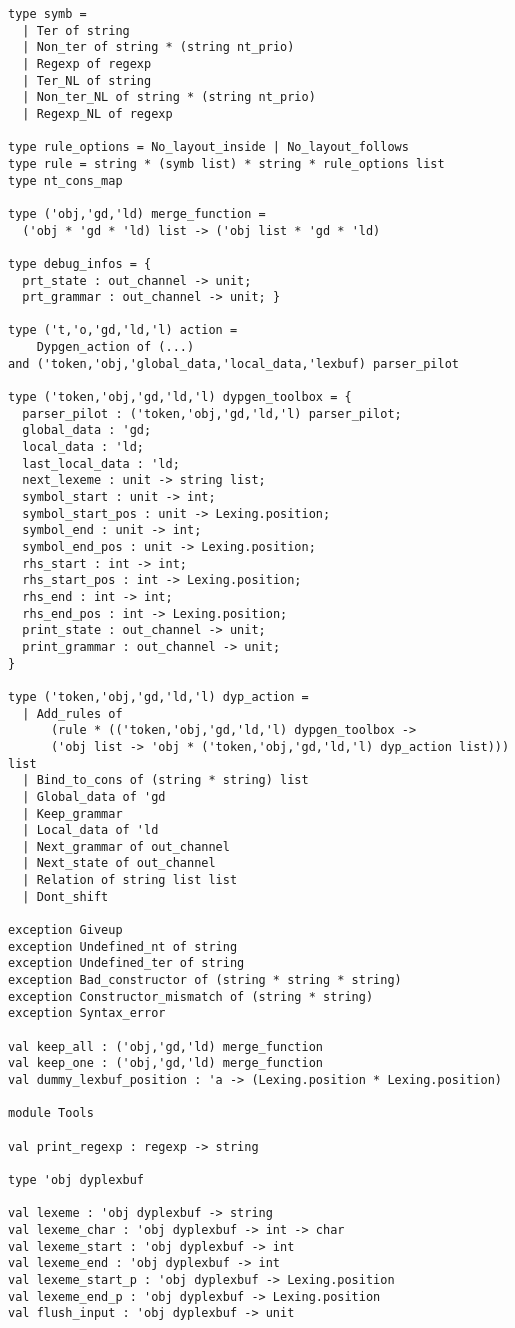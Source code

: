 \documentclass[12pt]{article}
\begin{document}
{\begin{verbatim}
type symb =
  | Ter of string
  | Non_ter of string * (string nt_prio)
  | Regexp of regexp
  | Ter_NL of string
  | Non_ter_NL of string * (string nt_prio)
  | Regexp_NL of regexp

type rule_options = No_layout_inside | No_layout_follows
type rule = string * (symb list) * string * rule_options list
type nt_cons_map

type ('obj,'gd,'ld) merge_function =
  ('obj * 'gd * 'ld) list -> ('obj list * 'gd * 'ld)

type debug_infos = {
  prt_state : out_channel -> unit;
  prt_grammar : out_channel -> unit; }

type ('t,'o,'gd,'ld,'l) action =
    Dypgen_action of (...)
and ('token,'obj,'global_data,'local_data,'lexbuf) parser_pilot

type ('token,'obj,'gd,'ld,'l) dypgen_toolbox = {
  parser_pilot : ('token,'obj,'gd,'ld,'l) parser_pilot;
  global_data : 'gd;
  local_data : 'ld;
  last_local_data : 'ld;
  next_lexeme : unit -> string list;
  symbol_start : unit -> int;
  symbol_start_pos : unit -> Lexing.position;
  symbol_end : unit -> int;
  symbol_end_pos : unit -> Lexing.position;
  rhs_start : int -> int;
  rhs_start_pos : int -> Lexing.position;
  rhs_end : int -> int;
  rhs_end_pos : int -> Lexing.position;
  print_state : out_channel -> unit;
  print_grammar : out_channel -> unit;
}

type ('token,'obj,'gd,'ld,'l) dyp_action =
  | Add_rules of
      (rule * (('token,'obj,'gd,'ld,'l) dypgen_toolbox ->
      ('obj list -> 'obj * ('token,'obj,'gd,'ld,'l) dyp_action list))) list
  | Bind_to_cons of (string * string) list
  | Global_data of 'gd
  | Keep_grammar
  | Local_data of 'ld
  | Next_grammar of out_channel
  | Next_state of out_channel
  | Relation of string list list
  | Dont_shift

exception Giveup
exception Undefined_nt of string
exception Undefined_ter of string
exception Bad_constructor of (string * string * string)
exception Constructor_mismatch of (string * string)
exception Syntax_error

val keep_all : ('obj,'gd,'ld) merge_function
val keep_one : ('obj,'gd,'ld) merge_function
val dummy_lexbuf_position : 'a -> (Lexing.position * Lexing.position)

module Tools

val print_regexp : regexp -> string

type 'obj dyplexbuf

val lexeme : 'obj dyplexbuf -> string
val lexeme_char : 'obj dyplexbuf -> int -> char
val lexeme_start : 'obj dyplexbuf -> int
val lexeme_end : 'obj dyplexbuf -> int
val lexeme_start_p : 'obj dyplexbuf -> Lexing.position
val lexeme_end_p : 'obj dyplexbuf -> Lexing.position
val flush_input : 'obj dyplexbuf -> unit


\end{verbatim}}
\end{document}
